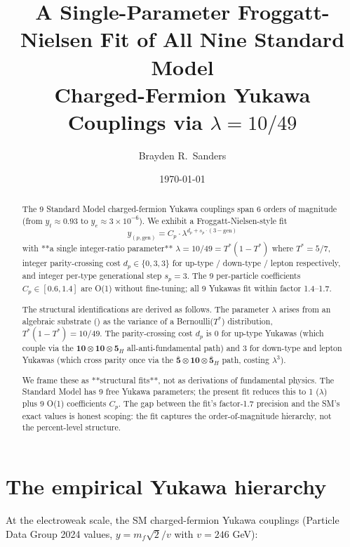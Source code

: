 \documentclass[11pt,reqno]{amsart}
\title[Yukawa Hierarchy from $\lambda = 10/49$]
{A Single-Parameter Froggatt-Nielsen Fit of All Nine Standard Model \\
 Charged-Fermion Yukawa Couplings via $\lambda = 10/49$}
\author{Brayden R.~Sanders}
\date{\today}
\theoremstyle{plain}
\theoremstyle{definition}
\theoremstyle{remark}
\begin{document}
\begin{abstract}
The 9 Standard Model charged-fermion Yukawa couplings span 6 orders of
magnitude (from $y_t \approx 0.93$ to $y_e \approx 3 \times 10^{-6}$).
We exhibit a Froggatt-Nielsen-style fit
\[
y_{(p, \text{gen})} = C_p \cdot \lambda^{d_p + s_p \cdot (3 - \text{gen})}
\]
with **a single integer-ratio parameter** $\lambda = 10/49 = T^*(1-T^*)$
where $T^* = 5/7$, integer parity-crossing cost $d_p \in \{0, 3, 3\}$
for up-type / down-type / lepton respectively, and integer per-type
generational step $s_p = 3$. The 9 per-particle coefficients $C_p \in
[0.6, 1.4]$ are O(1) without fine-tuning; all 9 Yukawas fit within
factor 1.4--1.7.

The structural identifications are derived as follows. The parameter
$\lambda$ arises from an algebraic substrate
(\cite{Sanders2026Dirac}) as the variance of a Bernoulli($T^*$)
distribution, $T^*(1-T^*) = 10/49$. The parity-crossing cost $d_p$ is
$0$ for up-type Yukawas (which couple via the $\mathbf{10} \otimes
\mathbf{10} \otimes \mathbf{5}_H$ all-anti-fundamental path) and $3$ for
down-type and lepton Yukawas (which cross parity once via the
$\bar{\mathbf{5}} \otimes \mathbf{10} \otimes \bar{\mathbf{5}}_H$ path,
costing $\lambda^3$).

We frame these as **structural fits**, not as derivations of fundamental
physics. The Standard Model has 9 free Yukawa parameters; the present
fit reduces this to 1 ($\lambda$) plus 9 O(1) coefficients $C_p$. The
gap between the fit's factor-1.7 precision and the SM's exact values is
honest scoping: the fit captures the order-of-magnitude hierarchy, not
the percent-level structure.
\end{abstract}

\maketitle

\tableofcontents

\section{The empirical Yukawa hierarchy}

At the electroweak scale, the SM charged-fermion Yukawa couplings (Particle
Data Group 2024 values, $y = m_f \sqrt{2} / v$ with $v = 246$ GeV):
\end{document}
